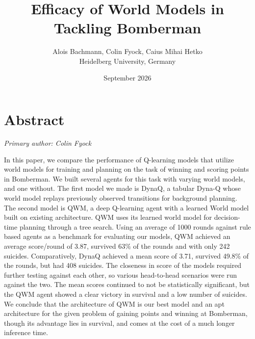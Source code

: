 \documentclass[article, 10pt]{IEEEtran}
\begin{document}
\title{Efficacy of World Models in Tackling Bomberman}
\author{Alois Bachmann, Colin Fyock, Caius Mihai Hetko \\
Heidelberg University, Germany
\date{September 2026}
}

\maketitle

\section{Abstract}\label{sec:0_abstract}

\textit{Primary author: Colin Fyock}

In this paper, we compare the performance of Q-learning models that utilize world models for training and planning on the task of winning and scoring points in Bomberman. We built several agents for this task with varying world models, and one without. The first model we made is DynaQ, a tabular Dyna-Q whose world model replays previously observed transitions for background planning. The second model is QWM, a deep Q-learning agent with a learned World model built on existing architecture\cite{dong2026qwm}. QWM uses its learned world model for decision-time planning through a tree search. Using an average of 1000 rounds against rule based agents as a benchmark for evaluating our models, QWM achieved an average score/round of 3.87, survived 63\% of the rounds and with only 242 suicides. Comparatively, DynaQ achieved a mean score of 3.71, survived 49.8\% of the rounds, but had 408 suicides. The closeness in score of the models required further testing against each other, so various head-to-head scenarios were run against the two. The mean scores continued to not be statistically significant, but the QWM agent showed a clear victory in survival and a low number of suicides. We conclude that the architecture of QWM is our best model and an apt architecture for the given problem of gaining points and winning at Bomberman, though its advantage lies in survival, and comes at the cost of a much longer inference time.
\end{document}
